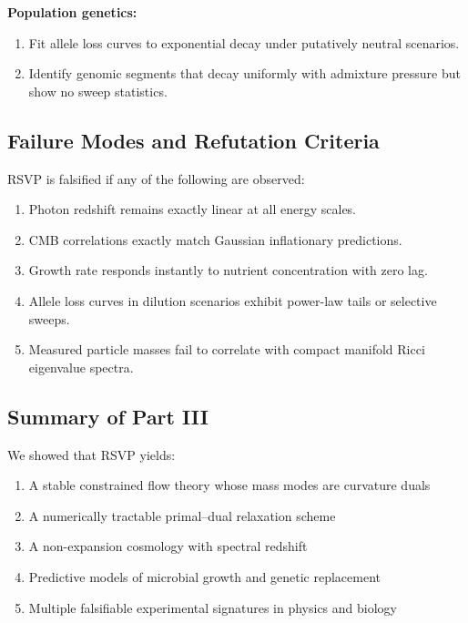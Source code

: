 \documentclass[11pt,a4paper]{article}
\begin{document}
\textbf{Population genetics:}

\begin{enumerate}
    \item Fit allele loss curves to exponential decay under putatively neutral scenarios.
    \item Identify genomic segments that decay uniformly with admixture pressure but show no sweep statistics.
\end{enumerate}

\subsection{Failure Modes and Refutation Criteria}

RSVP is falsified if any of the following are observed:

\begin{enumerate}
    \item Photon redshift remains exactly linear at all energy scales.
    \item CMB correlations exactly match Gaussian inflationary predictions.
    \item Growth rate responds instantly to nutrient concentration with zero lag.
    \item Allele loss curves in dilution scenarios exhibit power-law tails or selective sweeps.
    \item Measured particle masses fail to correlate with compact manifold Ricci eigenvalue spectra.
\end{enumerate}

\subsection{Summary of Part III}

We showed that RSVP yields:

\begin{enumerate}
    \item A stable constrained flow theory whose mass modes are curvature duals
    \item A numerically tractable primal–dual relaxation scheme
    \item A non-expansion cosmology with spectral redshift
    \item Predictive models of microbial growth and genetic replacement
    \item Multiple falsifiable experimental signatures in physics and biology
\end{enumerate}
\end{document}
